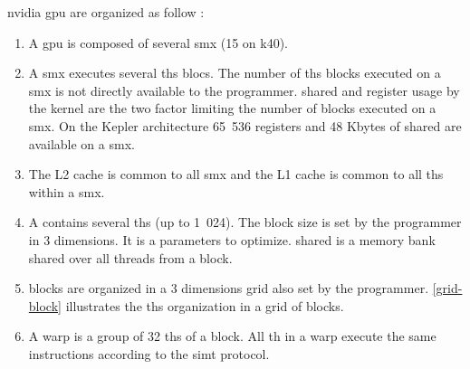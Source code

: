 \gls{nvidia} \gls{gpu} are organized as follow \cite{doccuda} :
\begin{enumerate}

\item A \gls{gpu} is composed of several \gls{smx} (15 on \gls{k40}).

\item A \gls{smx} executes several \glspl{th} \glspl{bloc}.
The number of \glspl{th} \glspl{block} executed on a \gls{smx} is not directly available to the programmer.
\Gls{shared} and register usage by the kernel are the two factor limiting the number of \glspl{block} executed on a \gls{smx}.
On the Kepler architecture 65~536 registers and 48 Kbytes of \gls{shared} are available on a \gls{smx}.

\item The L2 cache is common to all \gls{smx} and the L1 cache is common to all \glspl{th} within a \gls{smx}.

\item A  contains several \glspl{th} (up to 1~024).
The \gls{block} size is set by the programmer in 3 dimensions. It is a parameters to optimize.
\Gls{shared} is a memory bank shared over all threads from a \gls{block}.

\item \Glspl{block} are organized in a 3 dimensions grid also set by the programmer. 
\autoref{grid-block} illustrates the \glspl{th} organization in a grid of \glspl{block}.

\item A \gls{warp} is a group of 32 \glspl{th} of a block.
All \gls{th} in a \gls{warp} execute the same instructions according to the \gls{simt} protocol.

\end{enumerate}
\bigskip





